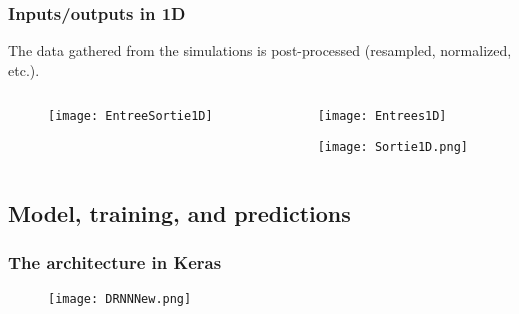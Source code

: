 \begin{frame}[fragile]
  \frametitle{Inputs/outputs in 1D}

  \begin{block}{\vspace*{-3cm}}
    \centering The data gathered from the simulations is post-processed (resampled, normalized, etc.). 
  \end{block}

  \begin{columns}
  \begin{column}{0.7\textwidth}
      \begin{figure}
      \texttt{[image: EntreeSortie1D]}       
      \end{figure}
   \end{column}
   \begin{column}{0.3\textwidth}
      \begin{figure}
      \texttt{[image: Entrees1D]}       
      \end{figure}
      \begin{figure}
        \texttt{[image: Sortie1D.png]}       
      \end{figure}
   \end{column}
  \end{columns}

\end{frame}




\subsection{Model, training, and predictions}



\begin{frame}
  \frametitle{The architecture in Keras}
  \begin{center}
      \begin{figure}
      \texttt{[image: DRNNNew.png]}    %
      \end{figure}
  \end{center}
\end{frame}



